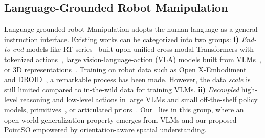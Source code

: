\subsection{Language-Grounded Robot Manipulation}
Language-grounded robot Manipulation adopts the human language as a general instruction interface.
Existing works can be categorized into two groups:
\textbf{i)} \textit{End-to-end} models like RT-series~\cite{RT123,RT223,RTH24} built upon unified cross-modal Transformers with tokenized actions~\cite{PERACT22,InstructRL22,ALOHA23,Peract224,QueST24,RoboFlamingo24,RoboCat24}, large vision-language-action (VLA) models built from VLMs~\cite{OpenVLA24}, or 3D representations~\cite{PolarNet23,3DVLA24,RoboPoint24}.
Training on robot data such as Open X-Embodiment~\cite{OpenXEmbodiment24} and DROID~\cite{DROID24}, a remarkable process has been made.
However, the data \textit{scale} is still limited compared to in-the-wild data for training VLMs.
\textbf{ii)} \textit{Decoupled} high-level reasoning and low-level actions in large VLMs and small off-the-shelf policy models, primitives~\cite{SayCan22,InnerMonologue22,CodeAsPolicy23,VoxPoser23,GroundedDecoding23,CoPa24,MOKA24,UniSim24,ManipAnywhere24,PIVOT24,RoboEXP24,robomatrix24}, or articulated priors~\cite{a3vlm24,ManipLLM24}.
Our \sofar~lies in this group, where an open-world generalization property emerges from VLMs and our proposed PointSO empowered by orientation-aware spatial understanding.

